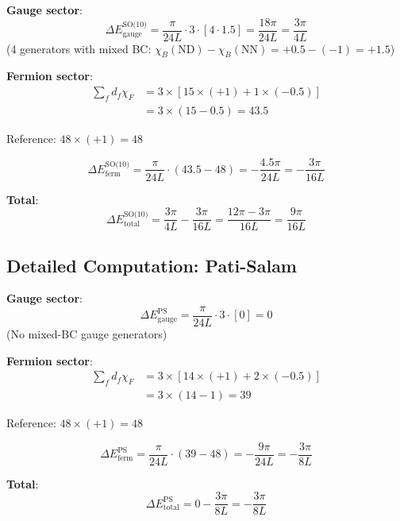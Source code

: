 \documentclass[11pt,a4paper]{article}
\begin{document}
\begin{computebox}
\textbf{Gauge sector}:
\begin{equation}
\label{eq:comp-so10-gauge}
\Delta E_{\text{gauge}}^{\text{SO(10)}} = \frac{\pi}{24L} \cdot 3 \cdot [4 \cdot 1.5] = \frac{18\pi}{24L} = \frac{3\pi}{4L}
\end{equation}
(4 generators with mixed BC: $\chi_B(\text{ND}) - \chi_B(\text{NN}) = +0.5 - (-1) = +1.5$)

\textbf{Fermion sector}:
\begin{align}
\label{eq:comp-so10-ferm-detail}
\sum_f d_f \chi_F &= 3 \times [15 \times (+1) + 1 \times (-0.5)] \\
\label{eq:comp-so10-ferm-eval}
&= 3 \times (15 - 0.5) = 43.5
\end{align}

Reference: $48 \times (+1) = 48$

\begin{equation}
\label{eq:comp-so10-ferm-final}
\Delta E_{\text{ferm}}^{\text{SO(10)}} = \frac{\pi}{24L} \cdot (43.5 - 48) = -\frac{4.5\pi}{24L} = -\frac{3\pi}{16L}
\end{equation}

\textbf{Total}:
\begin{equation}
\label{eq:comp-so10-total}
\Delta E_{\text{total}}^{\text{SO(10)}} = \frac{3\pi}{4L} - \frac{3\pi}{16L} = \frac{12\pi - 3\pi}{16L} = \frac{9\pi}{16L}
\end{equation}
\end{computebox}

\subsection{Detailed Computation: Pati-Salam}

\begin{computebox}
\textbf{Gauge sector}:
\begin{equation}
\label{eq:comp-ps-gauge}
\Delta E_{\text{gauge}}^{\text{PS}} = \frac{\pi}{24L} \cdot 3 \cdot [0] = 0
\end{equation}
(No mixed-BC gauge generators)

\textbf{Fermion sector}:
\begin{align}
\label{eq:comp-ps-ferm-detail}
\sum_f d_f \chi_F &= 3 \times [14 \times (+1) + 2 \times (-0.5)] \\
\label{eq:comp-ps-ferm-eval}
&= 3 \times (14 - 1) = 39
\end{align}

Reference: $48 \times (+1) = 48$

\begin{equation}
\label{eq:comp-ps-ferm-final}
\Delta E_{\text{ferm}}^{\text{PS}} = \frac{\pi}{24L} \cdot (39 - 48) = -\frac{9\pi}{24L} = -\frac{3\pi}{8L}
\end{equation}

\textbf{Total}:
\begin{equation}
\label{eq:comp-ps-total}
\Delta E_{\text{total}}^{\text{PS}} = 0 - \frac{3\pi}{8L} = -\frac{3\pi}{8L}
\end{equation}
\end{computebox}
\end{document}
